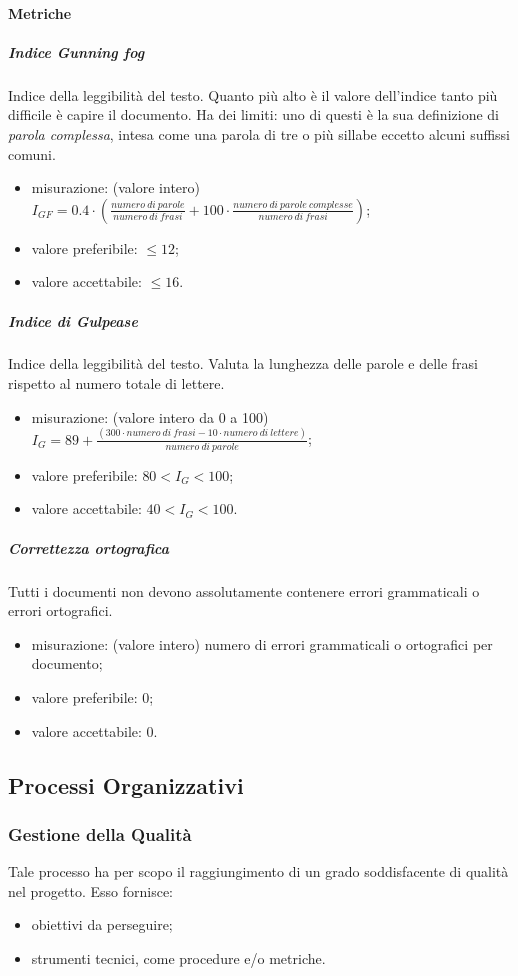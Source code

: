 		\paragraph{Metriche}
			\subparagraph{Indice Gunning fog}
			Indice della leggibilità del testo. Quanto più alto è il valore dell'indice tanto più difficile è capire il documento.					\newline
			Ha dei limiti: uno di questi è la sua definizione di \textit{parola complessa}, intesa come una parola di tre o più sillabe eccetto alcuni suffissi comuni.
			\begin{itemize}
				\item misurazione: (valore intero) $ I_{GF} = 0.4 \cdot
				(
				\frac{numero\ di\ parole}{numero\ di\  frasi}
				+ 100 \cdot
				\frac{numero\ di\ parole\ complesse}{numero\ di\  frasi}
				) $;
				\item valore preferibile: $ \leq 12$;
				\item valore accettabile: $ \leq 16$.
			\end{itemize}
			\subparagraph{Indice di Gulpease}
			Indice della leggibilità del testo. Valuta la lunghezza delle parole e delle frasi rispetto al numero totale di lettere. 
			\begin{itemize}
				\item misurazione: (valore intero da 0 a 100)\newline 	
				$I_G = 89+ \frac{(300 \cdot numero\ di\ frasi - 10 \cdot numero\ di\ lettere)}{numero\ di\ parole}$;	
				\item valore preferibile: $80 < I_G < 100$;
				\item valore accettabile: $40 < I_G < 100$.
			\end{itemize}
			\subparagraph{Correttezza ortografica}
			Tutti i documenti non devono assolutamente contenere errori grammaticali o errori ortografici. 
			\begin{itemize}
				\item misurazione: (valore intero) numero di errori grammaticali o ortografici per documento;
				\item valore preferibile: 0;
				\item valore accettabile: 0.
			\end{itemize}
			
\subsection{Processi Organizzativi}
	\subsubsection{Gestione della Qualità}
	Tale processo ha per scopo il raggiungimento di un grado soddisfacente di qualità nel progetto. Esso fornisce:
	\begin{itemize}
		\item obiettivi da perseguire;
		\item strumenti tecnici, come procedure e/o metriche.
	\end{itemize}
